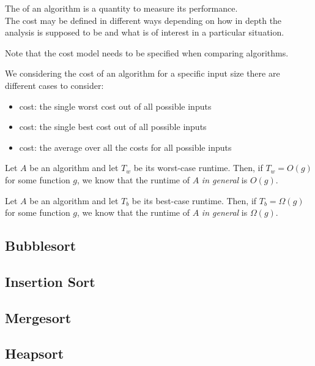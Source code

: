 \documentclass{article}
\begin{document}
\begin{definition}
	The  of an algorithm is a quantity to measure its performance.\\
	The cost may be defined in different ways depending on
	how in depth the analysis is supposed to be and what
	is of interest in a particular situation.
\end{definition}
Note that the cost model needs to be specified when comparing algorithms.
\begin{definition}
	We considering the cost of an algorithm for a specific input size there are different cases to consider:
	\begin{itemize}
		\item {} cost: the single worst cost out of all possible inputs
		\item {} cost: the single best cost out of all possible inputs
		\item {} cost: the average over all the costs for all possible inputs
	\end{itemize}
\end{definition}
\begin{theorem}
	Let $A$ be an algorithm and let $T_w$ be its worst-case runtime. Then, if $T_w=O(g)$ for some function $g$,
	we know that the runtime of $A$ \emph{in general} is $O(g)$.
\end{theorem}
\begin{theorem}
	Let $A$ be an algorithm and let $T_b$ be its best-case runtime. Then, if $T_b=\Omega(g)$ for some function $g$,
	we know that the runtime of $A$ \emph{in general} is $\Omega (g)$.
\end{theorem}


\subsection{Bubblesort}


\subsection{Insertion Sort}


\subsection{Mergesort}


\subsection{Heapsort}
\end{document}
